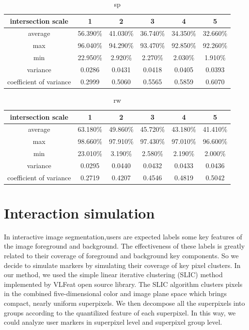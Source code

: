 \documentclass[runningheads,a4paper]{llncs}
\begin{document}
\begin{table}
\centering
\begin{tabular}{|c|c|c|c|c|c|}
\hline
intersection scale & 1 & 2 & 3 & 4& 5 \\
\hline
average& 56.390\% & 41.030\% & 36.740\% & 34.350\%& 32.660\% \\
\hline
max& 96.040\% & 94.290\% & 93.470\% & 92.850\%& 92.260\% \\
\hline
min& 22.950\% & 2.920\% & 2.270\% & 2.030\%& 1.910\%\\
\hline
variance& 0.0286 & 0.0431 & 0.0418& 0.0405&0.0393 \\
\hline
coefficient of variance& 0.2999 & 0.5060 & 0.5565 & 0.5859& 0.6070\\
\hline
\end{tabular}
\caption{sp}
\end{table} 

\begin{table}
\centering
\begin{tabular}{|c|c|c|c|c|c|}
\hline
intersection scale & 1 & 2 & 3 & 4& 5 \\
\hline
average& 63.180\% & 49.860\% & 45.720\% & 43.180\%& 41.410\% \\
\hline
max& 98.660\% & 97.910\% & 97.430\% & 97.010\%& 96.600\% \\
\hline
min& 23.010\% & 3.190\% & 2.580\% & 2.190\%& 2.000\%\\
\hline
variance& 0.0295 & 0.0440 & 0.0432 & 0.0433& 0.0436 \\
\hline
coefficient of variance& 0.2719 & 0.4207 & 0.4546 & 0.4819& 0.5042\\
\hline
\end{tabular}
\caption{rw}
\end{table} 



\section{Interaction simulation}
\paragraph{} In interactive image segmentation,users are expected labels some key features of the image foreground and background. The effectiveness of these labels is greatly related to their coverage of foreground and background key components. So we decide to simulate markers by simulating their coverage of key pixel clusters. In our method, we used the simple linear iterative clustering (SLIC)  method \citep{achanta2010slic} implemented by VLFeat open source library\citep{vedaldi08vlfeat}. The SLIC algorithm clusters pixels in the combined five-dimensional color and image plane space which brings compact, nearly uniform superpixels. We then decompose all the superpixels into groups according to the quantilized feature of each superpixel. In this way, we could analyze user markers in superpixel level and superpixel group level.
\end{document}
